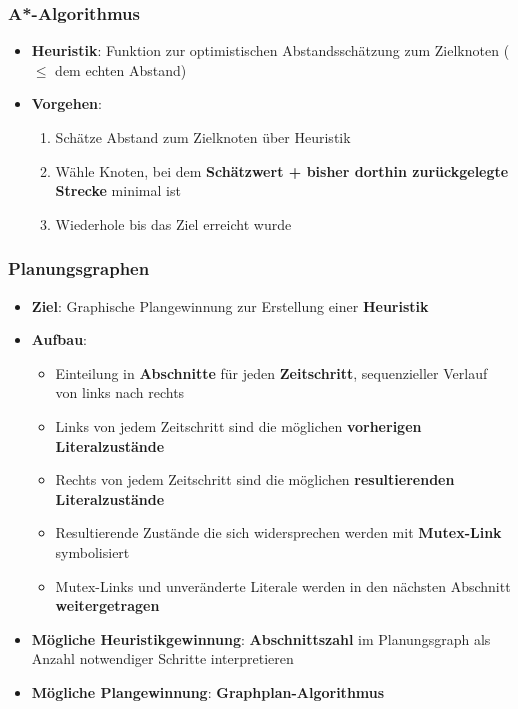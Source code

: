 \subsubsection{A*-Algorithmus}%
\label{plan:ssub:a_algorithmus}

\begin{itemize}
	\item \textbf{Heuristik}: Funktion zur optimistischen Abstandsschätzung zum Zielknoten ($\leq$ dem echten Abstand)
	\item \textbf{Vorgehen}:
	\begin{enumerate}
		\item Schätze Abstand zum Zielknoten über Heuristik
		\item Wähle Knoten, bei dem \textbf{Schätzwert + bisher dorthin zurückgelegte Strecke} minimal ist
		\item Wiederhole bis das Ziel erreicht wurde
	\end{enumerate}
\end{itemize}

\subsubsection{Planungsgraphen}%
\label{plan:ssub:planungsgraphen}

\begin{itemize}
	\item \textbf{Ziel}: Graphische Plangewinnung zur Erstellung einer \textbf{Heuristik}
	\item \textbf{Aufbau}:
	\begin{itemize}
		\item Einteilung in \textbf{Abschnitte} für jeden \textbf{Zeitschritt}, sequenzieller Verlauf von links nach rechts
		\item Links von jedem Zeitschritt sind die möglichen \textbf{vorherigen Literalzustände}
		\item Rechts von jedem Zeitschritt sind die möglichen \textbf{resultierenden Literalzustände}
		\item Resultierende Zustände die sich widersprechen werden mit \textbf{Mutex-Link} symbolisiert
		\item Mutex-Links und unveränderte Literale werden in den nächsten Abschnitt \textbf{weitergetragen}
	\end{itemize}
	\item \textbf{Mögliche Heuristikgewinnung}: \textbf{Abschnittszahl} im Planungsgraph als Anzahl notwendiger Schritte interpretieren
	\item \textbf{Mögliche Plangewinnung}: \textbf{Graphplan-Algorithmus}
\end{itemize}